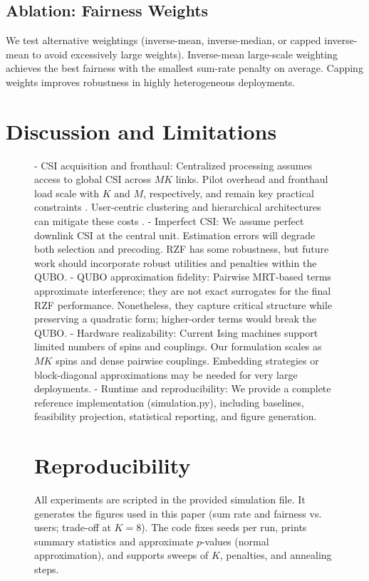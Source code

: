 {\subsection{Ablation: Fairness Weights}
We test alternative weightings (inverse-mean, inverse-median, or capped inverse-mean to avoid excessively large weights). Inverse-mean large-scale weighting achieves the best fairness with the smallest sum-rate penalty on average. Capping weights improves robustness in highly heterogeneous deployments.

\section{Discussion and Limitations}
\begin{figure}[htbp]
- CSI acquisition and fronthaul: Centralized processing assumes access to global CSI across $MK$ links. Pilot overhead and fronthaul load scale with $K$ and $M$, respectively, and remain key practical constraints \cite{bjornson2016massive,demir2021foundations}. User-centric clustering and hierarchical architectures can mitigate these costs \cite{chen2020structured}.
- Imperfect CSI: We assume perfect downlink CSI at the central unit. Estimation errors will degrade both selection and precoding. RZF has some robustness, but future work should incorporate robust utilities and penalties within the QUBO.
- QUBO approximation fidelity: Pairwise MRT-based terms approximate interference; they are not exact surrogates for the final RZF performance. Nonetheless, they capture critical structure while preserving a quadratic form; higher-order terms would break the QUBO.
- Hardware realizability: Current Ising machines support limited numbers of spins and couplings. Our formulation scales as $MK$ spins and dense pairwise couplings. Embedding strategies or block-diagonal approximations may be needed for very large deployments.
- Runtime and reproducibility: We provide a complete reference implementation (simulation.py), including baselines, feasibility projection, statistical reporting, and figure generation.

\section{Reproducibility}

All experiments are scripted in the provided simulation file. It generates the figures used in this paper (sum rate and fairness vs. users; trade-off at $K=8$). The code fixes seeds per run, prints summary statistics and approximate $p$-values (normal approximation), and supports sweeps of $K$, penalties, and annealing steps.


\end{figure}}
